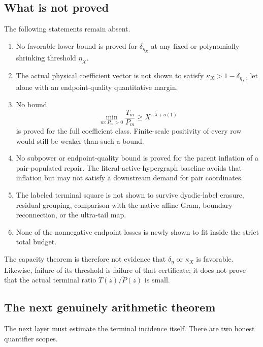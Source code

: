 \subsection{What is not proved}

The following statements remain absent.
\begin{enumerate}[leftmargin=2.3em]
 \item No favorable lower bound is proved for
       \(\delta_{\eta_X}\) at any fixed or polynomially shrinking
       threshold \(\eta_X\).
 \item The actual physical coefficient vector is not shown to satisfy
       \(\kappa_X>1-\delta_{\eta_X}\), let alone with an
       endpoint-quality quantitative margin.
 \item No bound
       \[
        \min_{m:P_m>0}\frac{T_m}{P_m}
        \ge X^{-\lambda+o(1)}
       \]
       is proved for the full coefficient class.  Finite-scale positivity
       of every row would still be weaker than such a bound.
 \item No subpower or endpoint-quality bound is proved for the parent
       inflation of a pair-populated repair.  The literal-active-hypergraph baseline
       avoids that inflation but may not satisfy a downstream demand for
       pair coordinates.
 \item The labeled terminal square is not shown to survive dyadic-label
       erasure, residual grouping, comparison with the native affine
       Gram, boundary reconnection, or the ultra-tail map.
 \item None of the nonnegative endpoint losses is newly shown to fit
       inside the strict total budget.
\end{enumerate}

The capacity theorem is therefore not evidence that
\(\delta_\eta\) or \(\kappa_X\) is favorable.  Likewise, failure of its
threshold is failure of that certificate; it does not prove that the
actual terminal ratio \(T(z)/\widetilde P(z)\) is small.

\subsection{The next genuinely arithmetic theorem}

The next layer must estimate the terminal incidence itself.  There are
two honest quantifier scopes.


